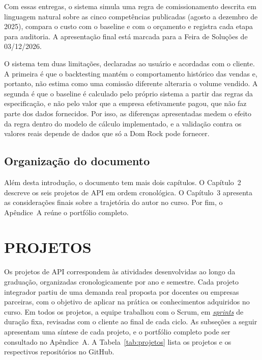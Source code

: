\documentclass[12pt,a4paper]{article}
\newcommand{\termo}[2]{\hyperlink{gls:#1}{\textit{#2}}}
\begin{document}
Com essas entregas, o sistema simula uma regra de comissionamento descrita em linguagem natural sobre as cinco competências publicadas (agosto a dezembro de 2025), compara o custo com o baseline e com o orçamento e registra cada etapa para auditoria. A apresentação final está marcada para a Feira de Soluções de 03/12/2026.

O sistema tem duas limitações, declaradas ao usuário e acordadas com o cliente. A primeira é que o backtesting mantém o comportamento histórico das vendas e, portanto, não estima como uma comissão diferente alteraria o volume vendido. A segunda é que o baseline é calculado pelo próprio sistema a partir das regras da especificação, e não pelo valor que a empresa efetivamente pagou, que não faz parte dos dados fornecidos. Por isso, as diferenças apresentadas medem o efeito da regra dentro do modelo de cálculo implementado, e a validação contra os valores reais depende de dados que só a Dom Rock pode fornecer.

\subsection{Organização do documento}

Além desta introdução, o documento tem mais dois capítulos. O Capítulo~2 descreve os seis projetos de API em ordem cronológica. O Capítulo~3 apresenta as considerações finais sobre a trajetória do autor no curso. Por fim, o Apêndice~A reúne o portfólio completo.

\clearpage
\section{PROJETOS}

Os projetos de API correspondem às atividades desenvolvidas ao longo da graduação, organizadas cronologicamente por ano e semestre. Cada projeto integrador partiu de uma demanda real proposta por docentes ou empresas parceiras, com o objetivo de aplicar na prática os conhecimentos adquiridos no curso. Em todos os projetos, a equipe trabalhou com o Scrum, em \termo{sprint}{sprints} de duração fixa, revisadas com o cliente ao final de cada ciclo. As subseções a seguir apresentam uma síntese de cada projeto, e o portfólio completo pode ser consultado no Apêndice~A. A Tabela~\ref{tab:projetos} lista os projetos e os respectivos repositórios no GitHub.
\end{document}

